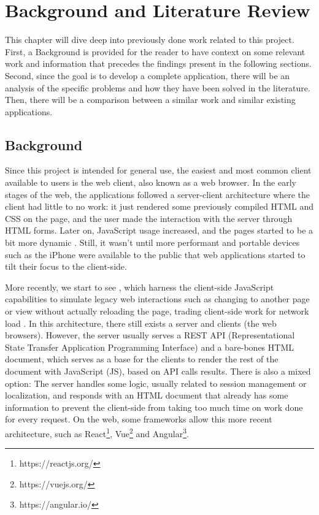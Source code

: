 
\chapter{Background and Literature Review} \label{chap:sota}

This chapter will dive deep into previously done work related to this project. First, a Background is provided for the reader to have context on some relevant work and information that precedes the findings present in the following sections. Second, since the goal is to develop a complete application, there will be an analysis of the specific problems and how they have been solved in the literature. Then, there will be a comparison between a similar work and similar existing applications.

\section{Background}

Since this project is intended for general use, the easiest and most common client available to users is the web client, also known as a web browser. In the early stages of the web, the applications followed a server-client architecture where the client had little to no work: it just rendered some previously compiled HTML and CSS on the page, and the user made the interaction with the server through HTML forms. Later on, JavaScript usage increased, and the pages started to be a bit more dynamic \cite{ShklarRosen09}. Still, it wasn't until more performant and portable devices such as the iPhone were available to the public that web applications started to tilt their focus to the client-side. 

More recently, we start to see , which harness the client-side JavaScript capabilities to simulate legacy web interactions such as changing to another page or view without actually reloading the page, trading client-side work for network load \cite{Lugo-Cordero2015} \cite{Derezinska2020} \cite{Mesbah2007} \cite{Mesbah2007a}. In this architecture, there still exists a server and clients (the web browsers). However, the server usually serves a REST API (Representational State Transfer Application Programming Interface) and a bare-bones HTML document, which serves as a base for the clients to render the rest of the document with JavaScript (JS), based on API calls results. There is also a mixed option: The server handles some logic, usually related to session management or localization, and responds with an HTML document that already has some information to prevent the client-side from taking too much time on work done for every request. On the web, some frameworks allow this more recent architecture, such as React\footnote{https://reactjs.org/}, Vue\footnote{https://vuejs.org/} and Angular\footnote{https://angular.io/}.

